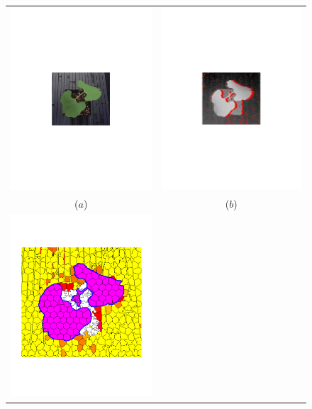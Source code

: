 \begin{figure}
\begin{center}
\begin{tabular}{cc}
\includegraphics[trim=190 280 190 290,clip,width=0.48\linewidth]{Figures/beanColor} &
\includegraphics[trim=190 280 190 290,clip,width=0.48\linewidth]{Figures/beanDepth} \\
($a$) & ($b$) \\
\includegraphics[trim=80 170 80 140,clip,width=0.48\linewidth]{Figures/slic_cropped2} &

\end{tabular}
\end{center}
\end{figure}
